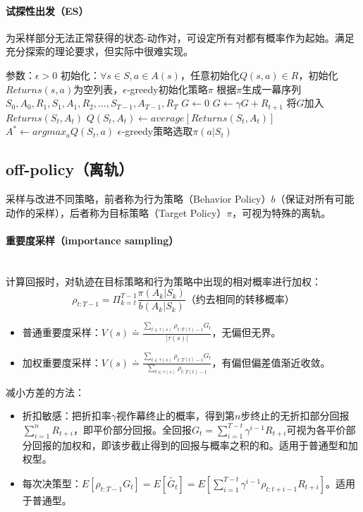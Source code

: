 \documentclass[
12pt, %
a4paper, 
oneside, %
headinclude,footinclude, %
]{scrartcl}
\begin{document}
\paragraph{试探性出发（ES）}
为采样部分无法正常获得的状态-动作对，可设定所有对都有概率作为起始。满足充分探索的理论要求，但实际中很难实现。
\begin{myalgorithm}
\State 参数：$ \epsilon > 0 $
\State 初始化：$ \forall s \in S, a \in A(s) $，任意初始化$ Q(s,a) \in R $，初始化$ Returns(s,a) $为空列表，$ \epsilon $-greedy初始化策略$ \pi $
\Loop
\State 根据$ \pi $生成一幕序列$ S_0,A_0,R_1,S_1,A_1,R_2,\dots,S_{T - 1},A_{T - 1},R_T $
\State $ G \gets 0 $
\State $ G \gets \gamma G + R_{t + 1} $
\State 将$ G $加入$ Returns(S_t,A_t) $
\State $ Q(S_t,A_t) \gets average[Returns(S_t,A_t)] $
\State $ A^* \gets argmax_a Q(S_t,a) $
\State $ \epsilon $-greedy策略选取$ \pi(a|S_t) $
\EndIf
\EndFor
\EndLoop
\end{myalgorithm}
\subsection[off-policy]{off-policy（离轨）}
采样与改进不同策略，前者称为行为策略（Behavior Policy）$ b $（保证对所有可能动作的采样），后者称为目标策略（Target Policy）$ \pi $，可视为特殊的离轨。
\paragraph{重要度采样（importance sampling）}~\\

计算回报时，对轨迹在目标策略和行为策略中出现的相对概率进行加权：
$$ \rho_{t:T - 1} = \Pi_{k = t}^{T - 1} \frac{\pi(A_k|S_k)}{b(A_k|S_k)} \text{（约去相同的转移概率）} $$
\begin{itemize}
\item 普通重要度采样：$ V(s) \doteq \frac{\sum_{t \in \tau(s)} \rho_{t:T(t) - 1}G_t}{|\tau(s)|} $，无偏但无界。
\item 加权重要度采样：$ V(s) \doteq \frac{\sum_{t \in \tau(s)} \rho_{t:T(t) - 1}G_t}{\sum_{t \in \tau(s)} \rho_{t:T(t) - 1}} $，有偏但偏差值渐近收敛。
\end{itemize}

减小方差的方法：
\begin{itemize}
\item 折扣敏感：把折扣率$ \gamma $视作幕终止的概率，得到第$ n $步终止的无折扣部分回报$ \sum_{i = 1}^n R_{t + i} $，即平价部分回报。全回报$ G_t = \sum_{i = 1}^{T - t} \gamma^{i - 1}R_{t + i} $可视为各平价部分回报的加权和，即该步截止得到的回报与概率之积的和。适用于普通型和加权型。
\item 每次决策型：$ E[\rho_{t:T - 1}G_t] = E[\tilde{G_t}] = E[\sum_{i = 1}^{T - t} \gamma^{i - 1} \rho_{t:t + i - 1}R_{t + i}] $。适用于普通型。
\end{itemize}
\end{document}
